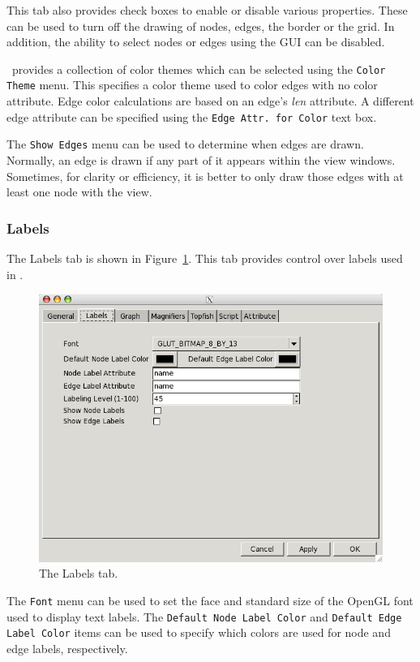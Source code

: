 This tab also provides check boxes to enable or disable various properties.
These can be used to turn off the drawing of nodes, edges, the border or the grid.
In addition, the ability to select nodes or edges using the GUI can be disabled.

\smyrna\ provides a collection of color themes which can be selected using the {\tt Color Theme}
menu. This specifies a color theme used to color edges with no color attribute. Edge color
calculations are based on an edge's {\em len} attribute. A different edge attribute can
be specified using the {\tt Edge Attr. for Color} text box. 

The {\tt Show Edges} menu can be used to determine when edges are drawn. Normally, an edge
is drawn if any part of it appears within the view windows. Sometimes, for clarity or efficiency,
it is better to only draw those edges with at least one node with the view.

\subsubsection{Labels}
\label{subsubsec:labels}
The Labels tab is shown in Figure~\ref{fig:labels}.
This tab provides control over labels used in \smyrna.
\begin{figure}[ht]
\begin{center}
\includegraphics[scale=.5]{figures/labels.png}
\caption{\small The Labels tab.}
\label{fig:labels}
\end{center}
\end{figure}
The {\tt Font} menu can be used to set the face and standard size of the OpenGL font used to
display text labels.
The {\tt Default Node Label Color} and {\tt Default Edge Label Color} items can be used to
specify which colors are used for node and edge labels, respectively.

